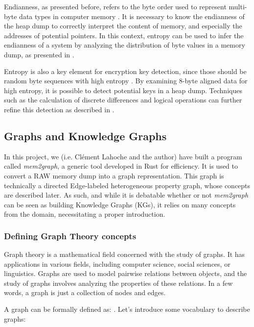     Endianness, as presented before, refers to the byte order used to represent multi-byte data types in computer memory \cite{InferenceEndianness17}. It is necessary to know the endianness of the heap dump to correctly interpret the content of memory, and especially the addresses of potential pointers. In this context, entropy can be used to infer the endianness of a system by analyzing the distribution of byte values in a memory dump, as presented in  \cite{InferenceEndianness17}.

    Entropy is also a key element for encryption key detection, since those should be random byte sequences with high entropy \cite{SmartKex22}. By examining 8-byte aligned data for high entropy, it is possible to detect potential keys in a heap dump. Techniques such as the calculation of discrete differences and logical operations can further refine this detection as described in  \cite{SmartKex22}.

    \subsection{Graphs and Knowledge Graphs}
    In this project, we (i.e. Clément Lahoche and the author) have built a program called \textit{mem2graph}, a generic tool developed in Rust for efficiency. It is used to convert a RAW memory dump into a graph representation. This graph is technically a directed Edge-labeled heterogeneous property graph, whose concepts are described later. As such, and while it is debatable whether or not \textit{mem2graph} can be seen as building Knowledge Graphs (KGs), it relies on many concepts from the domain, necessitating a proper introduction.

    \subsubsection{Defining Graph Theory concepts}
    Graph theory is a mathematical field concerned with the study of graphs. It has applications in various fields, including computer science, social sciences, or linguistics. Graphs are used to model pairwise relations between objects, and the study of graphs involves analyzing the properties of these relations. In a few words, a graph is just a collection of nodes and edges.
    
    A graph can be formally defined  as:  \cite{GraphTheorySolnon}. Let's introduce some vocabulary to describe graphs:

